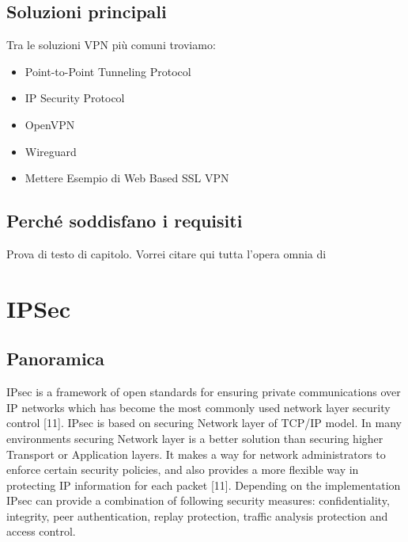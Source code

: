 \subsection{Soluzioni principali}
Tra le soluzioni VPN più comuni troviamo:
\begin{itemize}
    \item Point-to-Point Tunneling Protocol
    \item IP Security Protocol
    \item OpenVPN
    \item Wireguard
    \item Mettere Esempio di Web Based SSL VPN %
\end{itemize}



\subsection{Perché soddisfano i requisiti}
Prova di testo di capitolo. Vorrei citare qui tutta l'opera omnia di



\section{IPSec}
\subsection{Panoramica}
IPsec is a framework of open standards for ensuring private communications over IP networks which has become the most commonly used network layer security control [11]. IPsec is based on securing Network layer of TCP/IP model. In many environments securing Network layer is a better solution than securing higher Transport or Application layers. It makes a way for network administrators to enforce certain security policies, and also provides a more flexible way in protecting IP information for each packet [11]. Depending on the implementation IPsec can provide a combination of following security measures: confidentiality, integrity, peer authentication, replay protection, traffic analysis protection and access control.

